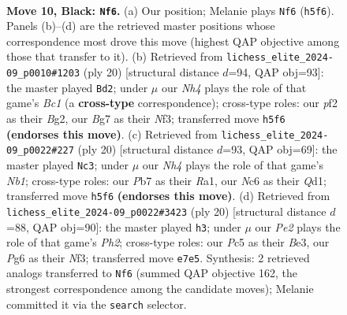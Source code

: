 \documentclass[11pt]{article}
\begin{document}
\clearpage

\begin{figure}[p]\centering
\begin{subfigure}{0.46\textwidth}\centering
\resizebox{\linewidth}{!}{%
\newchessgame
\chessboard[
  setfen={r1bq1rk1/pp1pppbp/2n3p1/2p4n/Q1P5/P1N2NP1/1P1PPPBP/R1B2RK1 b - - 6 10},
  showmover=false,
  pgfstyle=straightmove, color=movearrow, markmove={h5-f6}
]}
\caption{}
\end{subfigure}\hfill
\begin{subfigure}{0.46\textwidth}\centering
\resizebox{\linewidth}{!}{%
\newchessgame
\chessboard[
  setfen={r1bq1rk1/pp2p1bp/2np1np1/5p2/Q1P5/2N2NP1/PP2PPBP/R1B2RK1 w - - 0 11},
  showmover=false,
  pgfstyle=straightmove, color=movearrow, markmove={c1-d2}
]}
\caption{}
\end{subfigure}
\\[4pt]
\begin{subfigure}{0.46\textwidth}\centering
\resizebox{\linewidth}{!}{%
\newchessgame
\chessboard[
  setfen={r1b2rk1/pp2bppp/1qn1pn2/3p4/P4P2/1P2PNP1/1B1P2BP/RN1Q1RK1 w - - 3 11},
  showmover=false,
  pgfstyle=straightmove, color=movearrow, markmove={b1-c3}
]}
\caption{}
\end{subfigure}\hfill
\begin{subfigure}{0.46\textwidth}\centering
\resizebox{\linewidth}{!}{%
\newchessgame
\chessboard[
  setfen={r1b2rk1/pp2ppbp/2np1np1/q7/2P1P3/2N1BN2/PP2BPPP/R2Q1RK1 w - - 2 11},
  showmover=false,
  pgfstyle=straightmove, color=movearrow, markmove={h2-h3}
]}
\caption{}
\end{subfigure}
\caption{\textbf{Move 10, Black: \texttt{Nf6}.} (a) Our position; Melanie plays \texttt{Nf6} (\texttt{h5f6}). Panels (b)--(d) are the retrieved master positions whose correspondence most drove this move (highest QAP objective among those that transfer to it). (b) Retrieved from \texttt{lichess\_elite\_2024-09\_p0010\#1203} (ply 20) [structural distance $d$=94, QAP obj=93]: the master played \texttt{Bd2}; under $\mu$ our \emph{Nh4} plays the role of that game's \emph{Bc1} (a \textbf{cross-type} correspondence); cross-type roles: our \emph{p}f2 as their \emph{B}g2, our \emph{B}g7 as their \emph{N}f3; transferred move \texttt{h5f6} \textbf{(endorses this move)}. (c) Retrieved from \texttt{lichess\_elite\_2024-09\_p0022\#227} (ply 20) [structural distance $d$=93, QAP obj=69]: the master played \texttt{Nc3}; under $\mu$ our \emph{Nh4} plays the role of that game's \emph{Nb1}; cross-type roles: our \emph{P}b7 as their \emph{R}a1, our \emph{N}c6 as their \emph{Q}d1; transferred move \texttt{h5f6} \textbf{(endorses this move)}. (d) Retrieved from \texttt{lichess\_elite\_2024-09\_p0022\#3423} (ply 20) [structural distance $d$=88, QAP obj=90]: the master played \texttt{h3}; under $\mu$ our \emph{Pe2} plays the role of that game's \emph{Ph2}; cross-type roles: our \emph{P}c5 as their \emph{B}e3, our \emph{P}g6 as their \emph{N}f3; transferred move \texttt{e7e5}. Synthesis: 2 retrieved analogs transferred to \texttt{Nf6} (summed QAP objective 162, the strongest correspondence among the candidate moves); Melanie committed it via the \texttt{search} selector.}
\label{fig:thought-m19}
\end{figure}
\end{document}
